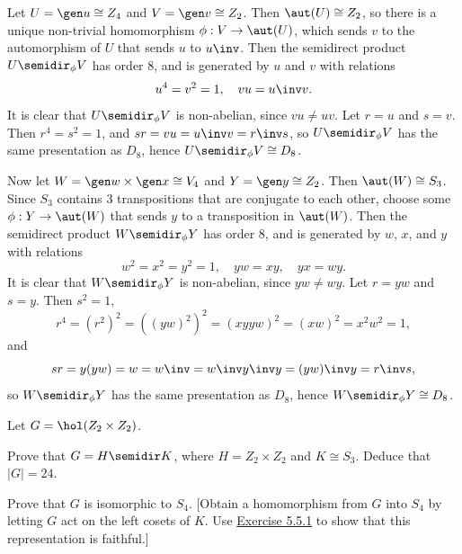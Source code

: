 \begin{sol}
    Let $U = \gen u \cong Z_4$ and $V = \gen v \cong Z_2$. Then $\aut(U) \cong Z_2$, so there is a unique non-trivial homomorphism $\phi : V \to \aut(U)$, which sends $v$ to the automorphism of $U$ that sends $u$ to $u\inv$. Then the semidirect product $U \semidir_\phi V$ has order 8, and is generated by $u$ and $v$ with relations
    \[u^4 = v^2 = 1, \quad vu = u\inv v.\]
    It is clear that $U \semidir_\phi V$ is non-abelian, since $vu \neq uv$. Let $r = u$ and $s = v$. Then $r^4 = s^2 = 1$, and $sr = vu = u\inv v = r\inv s$, so $U \semidir_\phi V$ has the same presentation as $D_8$, hence $U \semidir_\phi V \cong D_8$.

    Now let $W = \gen w \times \gen x \cong V_4$ and $Y = \gen y \cong Z_2$. Then $\aut(W) \cong S_3$. Since $S_3$ contains 3 transpositions that are conjugate to each other, choose some $\phi : Y \to \aut(W)$ that sends $y$ to a transposition in $\aut(W)$. Then the semidirect product $W \semidir_\phi Y$ has order 8, and is generated by $w$, $x$, and $y$ with relations
    \[w^2 = x^2 = y^2 = 1, \quad yw = x y, \quad yx = w y.\]
    It is clear that $W \semidir_\phi Y$ is non-abelian, since $yw \neq wy$. Let $r = yw$ and $s = y$. Then $s^2 = 1$,
    \[r^4 = (r^2)^2 = ((yw)^2)^2 = (xyyw)^2 = (xw)^2 = x^2w^2 = 1,\]
    and
    \[sr = y(yw) = w = w\inv = w\inv y\inv y = (yw)\inv y = r\inv s,\]
    so $W \semidir_\phi Y$ has the same presentation as $D_8$, hence $W \semidir_\phi Y \cong D_8$.
\end{sol}

\begin{exercise}\label{ex5.5.5}
    Let $G = \hol(Z_2 \times Z_2)$.
    \begin{subproblems}
        \item Prove that $G = H \semidir K$, where $H = Z_2 \times Z_2$ and $K \cong S_3$. Deduce that $|G| = 24$.
        \item Prove that $G$ is isomorphic to $S_4$. [Obtain a homomorphism from $G$ into $S_4$ by letting $G$ act on the left cosets of $K$. Use \hyperref[ex5.5.1]{Exercise 5.5.1} to show that this representation is faithful.]
    \end{subproblems}
\end{exercise}

